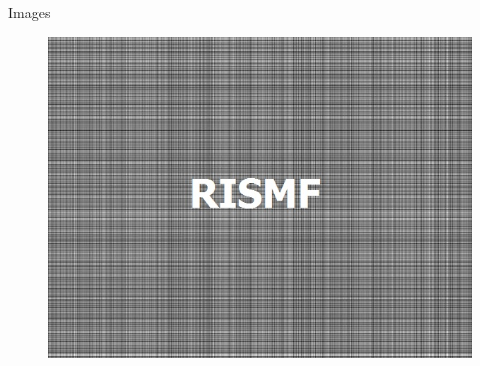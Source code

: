 \documentclass{beamer}
\begin{document}
\begin{frame}{Images}
\begin{multicols}{3}
\begin{figure}[h]
			\centering
			\includegraphics[width=0.95\linewidth]{./../data/images/presentation/with_capture/p1_4.jpg}
		\end{figure}
	\end{multicols}
	
\end{frame}
\end{document}
